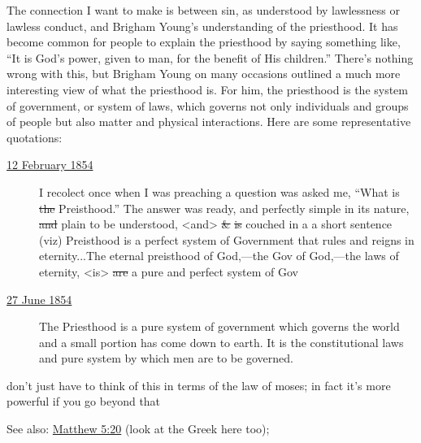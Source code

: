 			The connection I want to make is between sin,
				as understood by lawlessness or lawless conduct,
					and Brigham Young's understanding of the priesthood.
			It has become common for people to explain the priesthood by saying something like,
				``It is God's power, given to man, for the benefit of His children.''
			There's nothing wrong with this,
				but Brigham Young on many occasions outlined a much more interesting view of what the priesthood is.
			For him,
				the priesthood is the system of government,
					or system of laws,
						which governs not only individuals and groups of people but also matter and physical interactions.
			Here are some representative quotations:
			
				\begin{description}
					\item[{\hyperref[EMS-1854-BY-12-FEB-1854]{12 February 1854}}] I recolect once when I was preaching a question was asked me, ``What is \sout{the} Preisthood.'' The answer was ready, and perfectly simple in its nature, \sout{and} plain to be understood, <and> \sout{\&} \sout{is} couched in a a short sentence (viz) Preisthood is a perfect system of Government that rules and reigns in eternity...The eternal preisthood of God,---the Gov of God,---the laws of eternity, <is> \sout{are} a pure and perfect system of Gov
					\item[{\hyperref[EMS-1854-BY-27-JUN-1854]{27 June 1854}}] The Priesthood is a pure system of government which governs the world and a small portion has come down to earth. It is the constitutional laws and pure system by which men are to be governed. 
				\end{description}
			
			don't just have to think of this in terms of the law of moses; in fact it's more powerful if you go beyond that
			
			See also: \hyperref[MATTHEW-5-20]{Matthew 5:20} (look at the Greek here too); 
			
